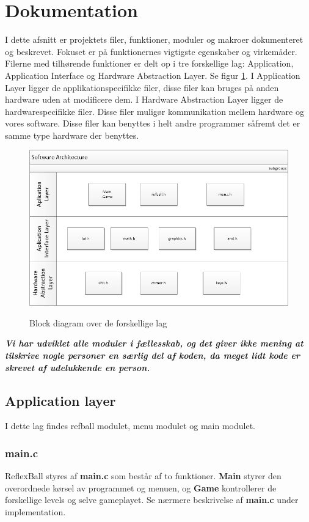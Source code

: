 \section{Dokumentation}

I dette afsnitt er projektets filer, funktioner, moduler og makroer dokumenteret og beskrevet. Fokuset er på funktionernes vigtigste egenskaber og virkemåder. Filerne med tilhørende funktioner er delt op i tre forskellige lag: Application, Application Interface og Hardware Abstraction Layer. Se figur \ref{block}.
 I Application Layer ligger de applikationspecifikke filer, disse filer kan bruges på anden hardware uden at modificere dem. I Hardware Abstraction Layer ligger de hardwarespecifikke filer. Disse filer muligør kommunikation mellem hardware og vores software. Disse filer kan benyttes i helt andre programmer såfremt det er samme type hardware der benyttes. 

\begin{figure}[h]
\begin{center}
\label{block}
\includegraphics[scale=0.6]{img/SoftwareArchitecture.png}
\caption{Block diagram over de forskellige lag}
\end{center}
\end{figure}
\textit{\textbf{Vi har udviklet alle moduler i fællesskab, og det giver ikke mening at tilskrive nogle personer en særlig del af koden, da meget lidt kode er skrevet af udelukkende en person.} }
\newpage
\subsection{Application layer}
I dette lag findes refball modulet, menu modulet og main modulet.
\subsubsection{main.c}
ReflexBall styres af \textbf{main.c} som består af to funktioner. \textbf{Main} styrer den overordnede kørsel av programmet og menuen, og \textbf{Game} kontrollerer de forskellige levels og selve gameplayet. Se nærmere beskrivelse af \textbf{main.c} under implementation.

